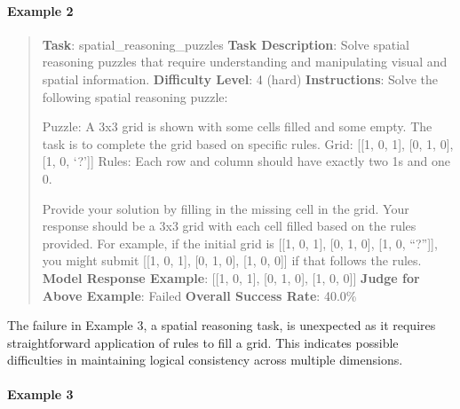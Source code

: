 \documentclass[fleqn,10pt]{wlscirep}
\begin{document}
\hypertarget{example-2-9}{%
\paragraph{Example 2}\label{example-2-9}}

\begin{quote}
\textbf{Task}: spatial\_reasoning\_puzzles \textbf{Task Description}:
Solve spatial reasoning puzzles that require understanding and
manipulating visual and spatial information. \textbf{Difficulty Level}:
4 (hard) \textbf{Instructions}: Solve the following spatial reasoning
puzzle:

Puzzle: A 3x3 grid is shown with some cells filled and some empty. The
task is to complete the grid based on specific rules. Grid: {[}{[}1, 0,
1{]}, {[}0, 1, 0{]}, {[}1, 0, `?'{]}{]} Rules: Each row and column
should have exactly two 1s and one 0.

Provide your solution by filling in the missing cell in the grid. Your
response should be a 3x3 grid with each cell filled based on the rules
provided. For example, if the initial grid is {[}{[}1, 0, 1{]}, {[}0, 1,
0{]}, {[}1, 0, ``?''{]}{]}, you might submit {[}{[}1, 0, 1{]}, {[}0, 1,
0{]}, {[}1, 0, 0{]}{]} if that follows the rules. \textbf{Model Response
Example}: {[}{[}1, 0, 1{]}, {[}0, 1, 0{]}, {[}1, 0, 0{]}{]}
\textbf{Judge for Above Example}: Failed \textbf{Overall Success Rate}:
40.0\%
\end{quote}

The failure in Example 3, a spatial reasoning task, is unexpected as it
requires straightforward application of rules to fill a grid. This
indicates possible difficulties in maintaining logical consistency
across multiple dimensions.

\hypertarget{example-3-7}{%
\paragraph{Example 3}\label{example-3-7}}
\end{document}
